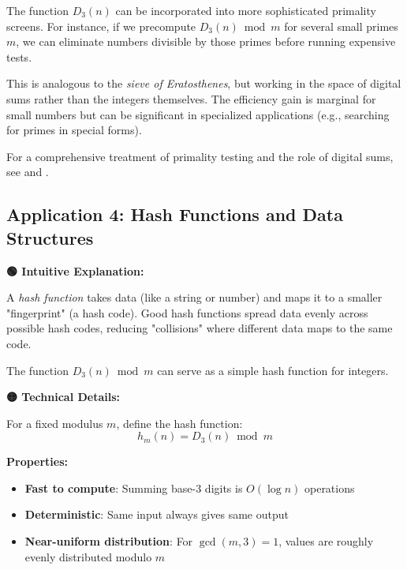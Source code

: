 The function $D_3(n)$ can be incorporated into more sophisticated primality screens. For instance, if we precompute $D_3(n) \bmod m$ for several small primes $m$, we can eliminate numbers divisible by those primes before running expensive tests.

This is analogous to the \textit{sieve of Eratosthenes}, but working in the space of digital sums rather than the integers themselves. The efficiency gain is marginal for small numbers but can be significant in specialized applications (e.g., searching for primes in special forms).

For a comprehensive treatment of primality testing and the role of digital sums, see \cite{crandall2005} and \cite{apostol1976}.

\subsection{Application 4: Hash Functions and Data Structures}

\textbf{🟢 Intuitive Explanation:}

A \textit{hash function} takes data (like a string or number) and maps it to a smaller "fingerprint" (a hash code). Good hash functions spread data evenly across possible hash codes, reducing "collisions" where different data maps to the same code.

The function $D_3(n) \bmod m$ can serve as a simple hash function for integers.

\textbf{🟡 Technical Details:}

\begin{definition}
\label{def:d3-hash}
For a fixed modulus $m$, define the hash function:
\begin{equation}
h_m(n) = D_3(n) \bmod m
\end{equation}
\end{definition}

\textbf{Properties:}
\begin{itemize}
\item \textbf{Fast to compute}: Summing base-3 digits is $O(\log n)$ operations
\item \textbf{Deterministic}: Same input always gives same output
\item \textbf{Near-uniform distribution}: For $\gcd(m, 3) = 1$, values are roughly evenly distributed modulo $m$
\end{itemize}

